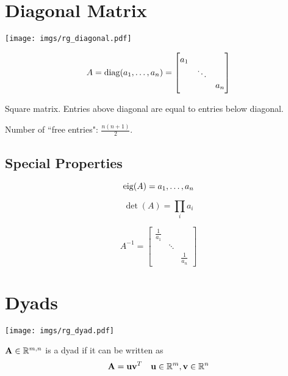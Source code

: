 \section{Diagonal Matrix}

\begin{center}
\texttt{[image: imgs/rg\_diagonal.pdf]}
\end{center}

\begin{equation}
A=\operatorname{diag}(a_1,\ldots,a_n)=
\begin{bmatrix}
a_1  &        &  \\
     & \ddots &  \\
     &        & a_n 
\end{bmatrix}
\end{equation}

Square matrix. Entries above diagonal are equal to entries below diagonal.

Number of ``free entries": $\frac{n(n+1)}{2}$.

\subsection*{Special Properties}

\begin{equation}
\operatorname{eig}(A)={a_1,\ldots,a_n}
\end{equation}

\begin{equation}
\det(A)=\prod_i a_i 
\end{equation}

\begin{equation}
A^{-1}=
\begin{bmatrix}
\frac{1}{a_1} &        &               \\
              & \ddots &               \\
              &        & \frac{1}{a_n}
\end{bmatrix}
\end{equation}




\section{Dyads}

\begin{center}
\texttt{[image: imgs/rg\_dyad.pdf]}
\end{center}

$\mathbf{A}\in\mathbb{R}^{m,n}$ is a dyad if it can be written as
\begin{equation}
\mathbf{A}=\mathbf{u}\mathbf{v}^T~~~\mathbf{u}\in\mathbb{R}^{m}, \mathbf{v}\in\mathbb{R}^{n}
\end{equation}

